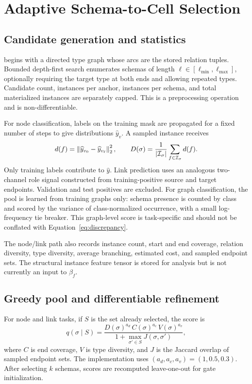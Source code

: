 \section{Adaptive Schema-to-Cell Selection}
\label{sec:ampss}

\subsection{Candidate generation and statistics}

\ampss{} begins with a directed type graph whose arcs are the stored relation tuples. Bounded
depth-first search enumerates schemas of length $\ell\in[\ell_{\min},\ell_{\max}]$, optionally
requiring the target type at both ends and allowing repeated types. Candidate count, instances per
anchor, instances per schema, and total materialized instances are separately capped. This is a
preprocessing operation and is non-differentiable.

For node classification, labels on the training mask are propagated for a fixed number of steps to
give distributions $\widehat{y}_v$. A sampled instance receives
\begin{equation}
  d(f)=\left\lVert \widehat{y}_{v_0}-\widehat{y}_{v_\ell}\right\rVert_2^2,\qquad
  D(\sigma)=\frac{1}{|\mathcal{I}_\sigma|}\sum_{f\in\mathcal{I}_\sigma}d(f).
  \label{eq:discrepancy}
\end{equation}
Only training labels contribute to $\widehat{y}$. Link prediction uses an analogous two-channel
role signal constructed from training-positive source and target endpoints. Validation and test
positives are excluded. For graph classification, the pool is learned from training graphs only:
schema presence is counted by class and scored by the variance of class-normalized occurrence,
with a small log-frequency tie breaker. This graph-level score is task-specific and should not be
conflated with Equation~\ref{eq:discrepancy}.

The node/link path also records instance count, start and end coverage, relation diversity, type
diversity, average branching, estimated cost, and sampled endpoint sets. The structural instance
feature tensor is stored for analysis but is not currently an input to $\beta_f$.

\subsection{Greedy pool and differentiable refinement}

For node and link tasks, if $S$ is the set already selected, the score is
\begin{equation}
  q(\sigma\mid S)=
  \frac{D(\sigma)^{a_d}\,C(\sigma)^{a_c}\,V(\sigma)^{a_v}}
  {1+\max_{\sigma'\in S}J(\sigma,\sigma')},
  \label{eq:topology-score}
\end{equation}
where $C$ is end coverage, $V$ is type diversity, and $J$ is the Jaccard overlap of sampled endpoint
sets. The implementation uses $(a_d,a_c,a_v)=(1,0.5,0.3)$. After selecting $k$ schemas, scores
are recomputed leave-one-out for gate initialization.

